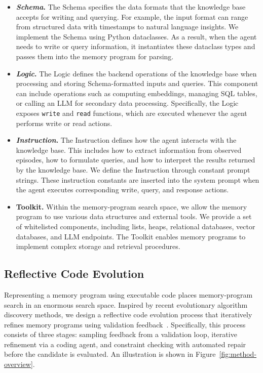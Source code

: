 \begin{itemize}
    \item \textbf{\textit{Schema}.}
    The Schema specifies the data formats that the knowledge base accepts for writing and querying.
    For example, the input format can range from structured data with timestamps to natural language insights.
    We implement the Schema using Python dataclasses.
    As a result, when the agent needs to write or query information, it instantiates these dataclass types and passes them into the memory program for parsing.

    \item \textbf{\textit{Logic}.}
    The Logic defines the backend operations of the knowledge base when processing and storing Schema-formatted inputs and queries.
    This component can include operations such as computing embeddings, managing SQL tables, or calling an LLM for secondary data processing.
    Specifically, the Logic exposes \texttt{write} and \texttt{read} functions, which are executed whenever the agent performs write or read actions.

    \item \textbf{\textit{Instruction}.}
    The Instruction defines how the agent interacts with the knowledge base.
    This includes how to extract information from observed episodes, how to formulate queries, and how to interpret the results returned by the knowledge base.
    We define the Instruction through constant prompt strings.
    These instruction constants are inserted into the system prompt when the agent executes corresponding write, query, and response actions.

    \item \textbf{Toolkit.}
    Within the memory-program search space, we allow the memory program to use various data structures and external tools.
    We provide a set of whitelisted components, including lists, heaps, relational databases, vector databases, and LLM endpoints.
    The Toolkit enables memory programs to implement complex storage and retrieval procedures.
\end{itemize}

\subsection{Reflective Code Evolution}
\label{sec:reflection}

Representing a memory program using executable code places memory-program search in an enormous search space.
Inspired by recent evolutionary algorithm discovery methods, we design a reflective code evolution process that iteratively refines memory programs using validation feedback~\citep{romera2024funsearch,chen2023evoprompting,deepmind2025alphaevolve}.
Specifically, this process consists of three stages: sampling feedback from a validation loop, iterative refinement via a coding agent, and constraint checking with automated repair before the candidate is evaluated. An illustration is shown in Figure~\ref{fig:method-overview}.


